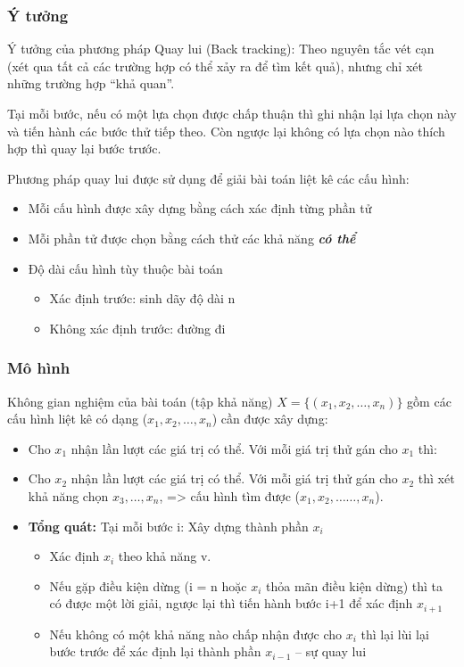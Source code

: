 \subsubsection{Ý tưởng}
Ý tưởng của phương pháp Quay lui (Back tracking): Theo nguyên tắc vét cạn (xét qua tất cả các trường hợp có thể xảy ra để tìm kết quả), nhưng chỉ xét những trường hợp “khả quan”.

Tại mỗi bước, nếu có một lựa chọn được chấp thuận thì ghi nhận lại lựa chọn này và tiến hành các bước thử tiếp theo. Còn ngược lại không có lựa chọn nào thích hợp thì quay lại bước trước.

Phương pháp quay lui được sử dụng để giải bài toán liệt kê các cấu hình:
\begin{itemize}
    \item Mỗi cấu hình được xây dựng bằng cách xác định từng phần tử
    \item Mỗi phần tử được chọn bằng cách thử các khả năng \textit{\textbf{có thể}}
    \item Độ dài cấu hình tùy thuộc bài toán
        \begin{itemize}
            \item Xác định trước: sinh dãy độ dài n
            \item Không xác định trước: đường đi
        \end{itemize}
\end{itemize}

\subsubsection{Mô hình}
Không gian nghiệm của bài toán (tập khả năng) $X=\{(x_1,x_2,…,x_n)\}$ gồm các cấu hình liệt kê có dạng ($x_1,x_2,…,x_n$) cần được xây dựng:
\begin{itemize}
    \item Cho $x_1$ nhận lần lượt các giá trị có thể. Với mỗi giá trị thử gán cho $x_1$ thì:
    \item Cho $x_2$ nhận lần lượt các giá trị có thể. Với mỗi giá trị thử gán cho $x_2$ thì xét khả năng chọn $x_3,…, x_n$, => cấu hình tìm được ($x_1, x_2, ……, x_n$).
    \item \textbf{Tổng quát:} Tại mỗi bước i: Xây dựng thành phần $x_i$
    \begin{itemize}
        \item Xác định $x_i$ theo khả năng v.
        \item Nếu gặp điều kiện dừng (i = n hoặc $x_i$ thỏa mãn điều kiện dừng) thì ta có được một lời giải, ngược lại thì tiến hành bước i+1 để xác định $x_{i+1}$
        \item Nếu không có một khả năng nào chấp nhận được cho $x_i$ thì lại lùi lại bước trước để xác định lại thành phần $x_{i-1}$ – sự quay lui
    \end{itemize}
\end{itemize}

